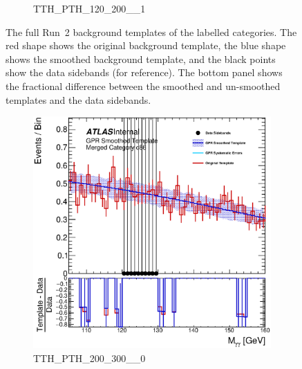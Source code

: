 \begin{figure}
\begin{center}
\begin{subfigure}[T]{0.49\linewidth}
	\caption{TTH\_PTH\_120\_200\_\_1}
\end{subfigure}
\caption{The full Run~2 background templates of the labelled categories. The red shape shows the original background template, the blue shape shows the smoothed background template, and the black points show the data sidebands (for reference). The bottom panel shows the fractional difference between the smoothed and un-smoothed templates and the data sidebands. }
\label{fig:gpr_coupcat_21}
\end{center}
\end{figure}

\begin{figure}
\begin{center}
\begin{subfigure}[T]{0.49\linewidth}
	\centering
	\includegraphics[width=\linewidth]{figures/background/gpr/coupCatTemplates/GPR_Smoothed_Plot_hmgg_c86.eps}
	\caption{TTH\_PTH\_200\_300\_\_0}
\end{subfigure}
\begin{subfigure}[T]{0.49\linewidth}
	\centering

\end{subfigure}
\end{center}
\end{figure}
